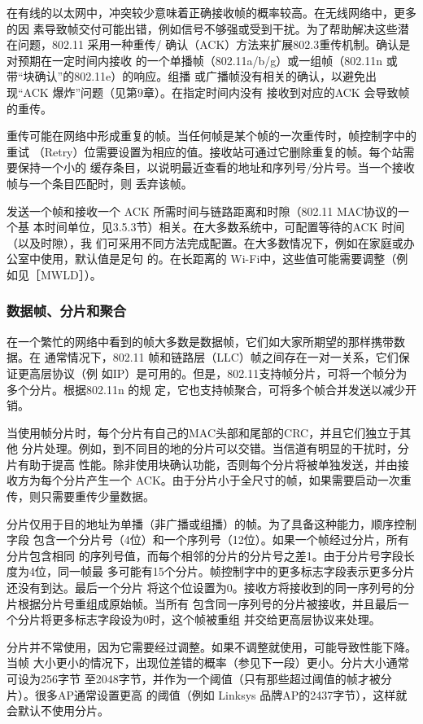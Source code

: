 在有线的以太网中，冲突较少意味着正确接收帧的概率较高。在无线网络中，更多的因
素导致帧交付可能出错，例如信号不够强或受到干扰。为了帮助解决这些潜在问题，802.11
采用一种重传/ 确认（ACK）方法来扩展802.3重传机制。确认是对预期在一定时间内接收
的一个单播帧（802.11a/b/g）或一组帧（802.11n 或带“块确认”的802.11e）的响应。组播
或广播帧没有相关的确认，以避免出现“ACK 爆炸”问题（见第9章）。在指定时间内没有
接收到对应的ACK 会导致帧的重传。

重传可能在网络中形成重复的帧。当任何帧是某个帧的一次重传时，帧控制字中的重试
（Retry）位需要设置为相应的值。接收站可通过它删除重复的帧。每个站需要保持一个小的
缓存条目，以说明最近查看的地址和序列号/分片号。当一个接收帧与一个条目匹配时，则
丢弃该帧。

发送一个帧和接收一个 ACK 所需时间与链路距离和时隙（802.11 MAC协议的一个基
本时间单位，见3.5.3节）相关。在大多数系统中，可配置等待的ACK 时间（以及时隙），我
们可采用不同方法完成配置。在大多数情况下，例如在家庭或办公室中使用，默认值是足句
的。在长距离的 Wi-Fi中，这些值可能需要调整（例如见［MWLD］）。

\subsubsection{数据帧、分片和聚合}

在一个繁忙的网络中看到的帧大多数是数据帧，它们如大家所期望的那样携带数据。在
通常情况下，802.11 帧和链路层（LLC）帧之间存在一对一关系，它们保证更高层协议（例
如IP）是可用的。但是，802.11支持帧分片，可将一个帧分为多个分片。根据802.11n 的规
定，它也支持帧聚合，可将多个帧合并发送以减少开销。

当使用帧分片时，每个分片有自己的MAC头部和尾部的CRC，并且它们独立于其他
分片处理。例如，到不同目的地的分片可以交错。当信道有明显的干扰时，分片有助于提高
性能。除非使用块确认功能，否则每个分片将被单独发送，并由接收方为每个分片产生一个
ACK。由于分片小于全尺寸的帧，如果需要启动一次重传，则只需要重传少量数据。

分片仅用于目的地址为单播（非广播或组播）的帧。为了具备这种能力，顺序控制字段
包含一个分片号（4位）和一个序列号（12位）。如果一个帧经过分片，所有分片包含相同
的序列号值，而每个相邻的分片的分片号之差1。由于分片号字段长度为4位，同一帧最
多可能有15个分片。帧控制字中的更多标志字段表示更多分片还没有到达。最后一个分片
将这个位设置为0。接收方将接收到的同一序列号的分片根据分片号重组成原始帧。当所有
包含同一序列号的分片被接收，并且最后一个分片将更多标志字段设为0时，这个帧被重组
并交给更高层协议来处理。

分片并不常使用，因为它需要经过调整。如果不调整就使用，可能导致性能下降。当帧
大小更小的情况下，出现位差错的概率（参见下一段）更小。分片大小通常可设为256字节
至2048字节，并作为一个阈值（只有那些超过阈值的帧才被分片）。很多AP通常设置更高
的阈值（例如 Linksys 品牌AP的2437字节），这样就会默认不使用分片。

